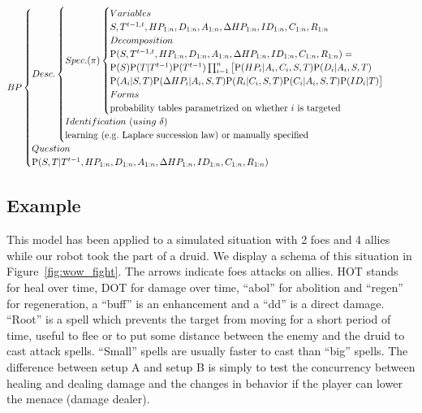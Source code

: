 \begin{eqnarray*}
BP
\begin{cases}
Desc.
    \begin{cases}
    Spec. (\pi)
        \begin{cases}
        Variables\\
        S, T^{t-1,t}, HP_{1:n}, D_{1:n}, A_{1:n}, \Delta HP_{1:n}, ID_{1:n}, C_{1:n}, R_{1:n}\\
        Decomposition\\
        \PP(S, T^{t-1,t}, HP_{1:n}, D_{1:n}, A_{1:n}, \Delta HP_{1:n}, ID_{1:n}, C_{1:n}, R_{1:n}) = \\
        \PP(S)\PP(T|T^{t-1})\PP(T^{t-1})\prod_{i=1}^n \big[ \PP(HP_i | A_i, C_i, S, T)\PP(D_i | A_i, S, T) \\
                \PP(A_i | S, T)\PP(\Delta HP_i | A_i, S, T) \PP(R_i | C_i, S, T) \PP(C_i | A_i, S, T) \PP(ID_i | T)\big]\\
        Forms\\
        \mathrm{probability\ tables\ parametrized\ on\ whether\ }i\ \mathrm{is\ targeted}\\
        \end{cases}\\
    Identification\ (using\ \delta)\\
    \mathrm{learning\ (e.g.\ Laplace\ succession\ law)\ or\ manually\ specified}\\
    \end{cases}\\
Question\\
\PP(S,T|T^{t-1}, HP_{1:n}, D_{1:n}, A_{1:n}, \Delta HP_{1:n}, ID_{1:n}, C_{1:n}, R_{1:n})
\end{cases}
\end{eqnarray*}

\subsection{Example}

This model has been applied to a simulated situation with 2 foes and 4 allies while our robot took the part of a druid. %
We display a schema of this situation in Figure~\ref{fig:wow_fight}. The arrows indicate foes attacks on allies. %
HOT stands for heal over time, DOT for damage over time, ``abol'' for abolition and ``regen'' for regeneration, a ``buff'' is an enhancement and a ``dd'' is a direct damage. ``Root'' is a spell which prevents the target from moving for a short period of time, useful to flee or to put some distance between the enemy and the druid to cast attack spells. ``Small'' spells are usually faster to cast than ``big'' spells. The difference between setup A and setup B is simply to test the concurrency between healing and dealing damage and the changes in behavior if the player can lower the menace (damage dealer).

